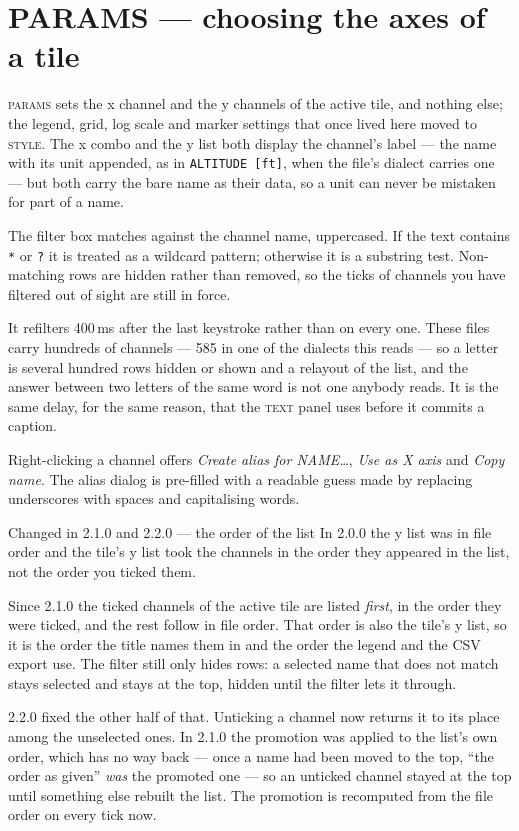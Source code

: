 \documentclass[11pt,a4paper,oneside]{report}
\newcommand{\appver}{2.2.0}
\newcommand{\code}[1]{\texttt{#1}}
\newcommand{\tab}[1]{\textsc{#1}}
\begin{document}
\section{PARAMS --- choosing the axes of a tile}
\label{sec:params}

\tab{params} sets the x channel and the y channels of the active tile, and
nothing else; the legend, grid, log scale and marker settings that once lived
here moved to \tab{style}. The x combo and the y list both display the channel's
label --- the name with its unit appended, as in \code{ALTITUDE [ft]}, when the
file's dialect carries one --- but both carry the bare name as their data, so a
unit can never be mistaken for part of a name.

The filter box matches against the channel name, uppercased. If the text
contains \code{*} or \code{?} it is treated as a wildcard pattern; otherwise it
is a substring test. Non-matching rows are hidden rather than removed, so the
ticks of channels you have filtered out of sight are still in force.

It refilters 400\,ms after the last keystroke rather than on every one. These
files carry hundreds of channels --- 585 in one of the dialects this reads ---
so a letter is several hundred rows hidden or shown and a relayout of the list,
and the answer between two letters of the same word is not one anybody reads.
It is the same delay, for the same reason, that the \tab{text} panel uses
before it commits a caption.

Right-clicking a channel offers \emph{Create alias for NAME\ldots}, \emph{Use as
X axis} and \emph{Copy name}. The alias dialog is pre-filled with a readable
guess made by replacing underscores with spaces and capitalising words.

\begin{aoenew}{Changed in 2.1.0 and \appver{} --- the order of the list}
In 2.0.0 the y list was in file order and the tile's y list took the channels in
the order they appeared in the list, not the order you ticked them.

Since 2.1.0 the ticked channels of the active tile are listed \emph{first}, in
the order they were ticked, and the rest follow in file order. That order is
also the tile's y list, so it is the order the title names them in and the order
the legend and the CSV export use. The filter still only hides rows: a selected
name that does not match stays selected and stays at the top, hidden until the
filter lets it through.

\appver{} fixed the other half of that. Unticking a channel now returns it to its
place among the unselected ones. In 2.1.0 the promotion was applied to the
list's own order, which has no way back --- once a name had been moved to the
top, ``the order as given'' \emph{was} the promoted one --- so an unticked
channel stayed at the top until something else rebuilt the list. The promotion
is recomputed from the file order on every tick now.
\end{aoenew}
\end{document}
